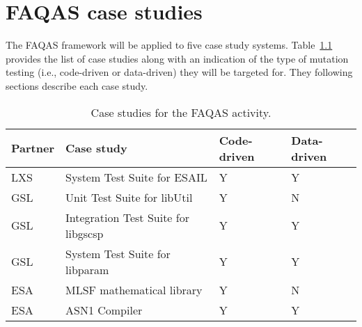 
\chapter{FAQAS case studies}
\label{chapter:caseStudies}

The FAQAS framework will be applied to five case study systems. Table~\ref{tab:caseStudies} provides the list of case studies along with an indication of the type of mutation testing (i.e., code-driven or data-driven) they will be targeted for. They following sections describe each case study.

\begin{table}[htp]
\caption{Case studies for the FAQAS activity.}
\label{tab:caseStudies}
\begin{center}
\begin{tabular}{|p{1.2cm}|p{6cm}|p{2.5cm}|p{2.5cm}|}
\hline
\textbf{Partner}&\textbf{Case study}&\textbf{Code-driven}&\textbf{Data-driven}\\
\hline
LXS&System Test Suite for ESAIL&Y&Y\\
GSL&Unit Test Suite for libUtil&Y&N\\
GSL&Integration Test Suite for libgscsp&Y&Y\\
GSL&System Test Suite for libparam&Y&Y\\
ESA&MLSF mathematical library&Y&N\\
ESA&ASN1 Compiler&Y&Y\\
\hline
\end{tabular}
\end{center}
\end{table}%

\clearpage










